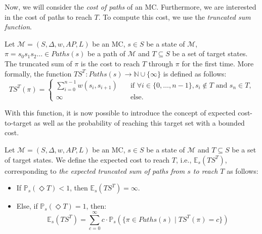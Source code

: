 Now, we will consider the \textit{cost of paths} of an MC. Furthermore, we
are interested in the cost of paths to reach $T$. To compute this cost, we use the \textit{truncated sum function}.

\begin{definition}
  Let $\mathcal{M}=(S, \Delta, w, AP, L)$ be an MC, $s \in S$ be a state of $\mathcal{M}$, $\pi = s_0s_1s_2\dots \in Paths(s)$ be a path of $\mathcal{M}$ and $T \subseteq S$ be a set of target states.
  The truncated sum of $\pi$ is the cost to reach $T$ through $\pi$
  for the first time. More formally, the function $TS^T: Paths(s) \rightarrow \mathbb{N} \cup \{\infty\}$ is defined as follows:
	\[
		TS^T(\pi) =
		\begin{cases}
			\sum_{i = 0}^{n-1} w(s_i, s_{i+1}) & \quad \text{if } \forall i \in \{0, \dots, n - 1\}, s_i \not\in T \text{ and } s_n \in T, \\
			\infty & \quad \text{else.}
		\end{cases}
	\]
\end{definition}
With this function, it is now possible to introduce the concept of
expected cost-to-target as well as
the probability of reaching this target set with a bounded cost.

\begin{definition}
	Let $\mathcal{M} = (S, \Delta, w, AP, L)$ be an MC, $s \in S$ be a state of $\mathcal{M}$ and $T \subseteq S$ be a set of target states. We define the expected cost to reach $T$, i.e., $\mathbb{E}_s(TS^T)$, corresponding to \textit{the expected truncated sum of paths from $s$ to reach $T$} as follows:
	\begin{itemize}
	\renewcommand{\labelitemi}{\tiny$\bullet$}
	\item If $\mathbb{P}_s(\Diamond T) < 1$, then $\mathbb{E}_s(TS^T) = \infty$.%
	\item Else, if $\mathbb{P}_s(\Diamond T) = 1$, then:
	\[
    \mathbb{E}_s(TS^T) = \sum_{c = 0}^\infty c \cdot \mathbb{P}_s(\{\pi \in Paths(s) \; | \; TS^T(\pi) = c \})
  \]
	\end{itemize}
\end{definition}

